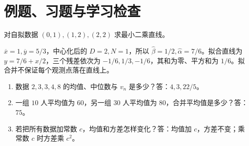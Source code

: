 \section{例题、习题与学习检查}
\begin{example}
对自拟数据 $(0,1),(1,2),(2,2)$ 求最小二乘直线。
\end{example}
\begin{solve}
$\overline x=1,\overline y=5/3$，中心化后的 $D=2,N=1$，所以 $\widehat\beta=1/2,\widehat\alpha=7/6$。拟合直线为 $y=7/6+x/2$，三个残差依次为 $-1/6,1/3,-1/6$，其和为零、平方和为 $1/6$。拟合并不保证每个观测点落在直线上。
\end{solve}
\begin{enumerate}
\item 数据 $2,3,3,4,8$ 的均值、中位数与 $v_n$ 是多少？答：$4,3,22/5$。
\item 一组 $10$ 人平均值为 $60$，另一组 $30$ 人平均值为 $80$，合并平均值是多少？答：$75$。
\item 若把所有数据加常数 $c$，均值和方差怎样变化？答：均值加 $c$，方差不变；乘常数 $c$ 时方差乘 $c^2$。
\end{enumerate}

